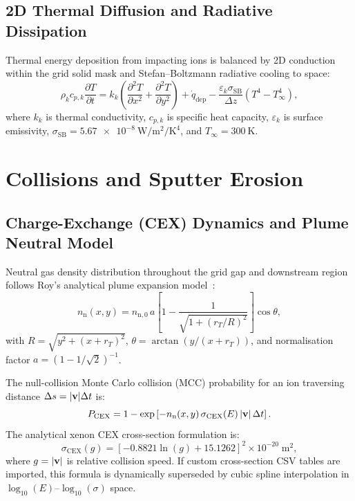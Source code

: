 \documentclass[11pt,a4paper]{article}
\begin{document}
\subsection{2D Thermal Diffusion and Radiative Dissipation}

Thermal energy deposition from impacting ions is balanced by 2D conduction within the grid solid mask and Stefan--Boltzmann radiative cooling to space:
\begin{equation}
    \rho_k c_{p,k} \frac{\partial T}{\partial t} = k_k \left(\frac{\partial^2 T}{\partial x^2} + \frac{\partial^2 T}{\partial y^2}\right) + \dot{q}_{\mathrm{dep}} - \frac{\varepsilon_k \sigma_{\mathrm{SB}}}{\Delta z}\left(T^4 - T_{\infty}^4\right),
\end{equation}
where $k_k$ is thermal conductivity, $c_{p,k}$ is specific heat capacity, $\varepsilon_k$ is surface emissivity, $\sigma_{\mathrm{SB}} = \SI{5.67e-8}{\watt\per\meter\squared\per\kelvin\tothe{4}}$, and $T_{\infty} = \SI{300}{\kelvin}$.

\section{Collisions and Sputter Erosion}

\subsection{Charge-Exchange (CEX) Dynamics and Plume Neutral Model}

Neutral gas density distribution throughout the grid gap and downstream region follows Roy's analytical plume expansion model~\cite{roy}:
\begin{equation}
    n_{\mathrm{n}}(x,y) = n_{\mathrm{n},0} \, a \left[1 - \frac{1}{\sqrt{1 + (r_T / R)^2}}\right] \cos\theta,
\end{equation}
with $R = \sqrt{y^2 + (x + r_T)^2}$, $\theta = \arctan(y / (x + r_T))$, and normalisation factor $a = (1 - 1/\sqrt{2})^{-1}$.

The null-collision Monte Carlo collision (MCC) probability for an ion traversing distance $\Delta s = |\vb{v}|\Delta t$ is:
\begin{equation}
    P_{\mathrm{CEX}} = 1 - \exp\left[-n_{\mathrm{n}}(x,y) \, \sigma_{\mathrm{CEX}}(E) \, |\vb{v}| \, \Delta t\right].
\end{equation}
The analytical xenon CEX cross-section formulation is:
\begin{equation}
    \sigma_{\mathrm{CEX}}(g) = \left[-0.8821\ln(g) + 15.1262\right]^2 \times 10^{-20} \;\si{\meter\squared},
\end{equation}
where $g = |\vb{v}|$ is relative collision speed. If custom cross-section CSV tables are imported, this formula is dynamically superseded by cubic spline interpolation in $\log_{10}(E)$--$\log_{10}(\sigma)$ space.
\end{document}
